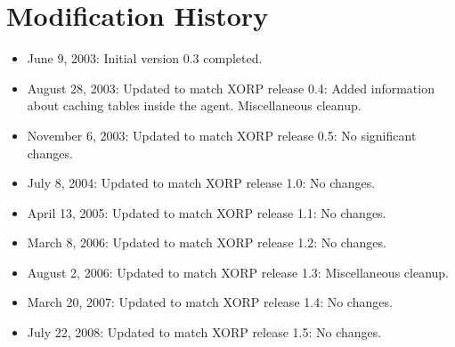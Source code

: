 \documentclass[11pt]{article}
\begin{document}
\appendix
\section{Modification History}

\begin{itemize}

  \item June 9, 2003: Initial version 0.3 completed.

  \item August 28, 2003: Updated to match XORP release 0.4:
   Added information about caching tables inside the agent. Miscellaneous
   cleanup.

  \item November 6, 2003: Updated to match XORP release 0.5:
   No significant changes.

  \item July 8, 2004: Updated to match XORP release 1.0:
   No changes.

  \item April 13, 2005: Updated to match XORP release 1.1:
   No changes.

  \item March 8, 2006: Updated to match XORP release 1.2:
   No changes.

  \item August 2, 2006: Updated to match XORP release 1.3:
   Miscellaneous cleanup.

  \item March 20, 2007: Updated to match XORP release 1.4:
   No changes.

  \item July 22, 2008: Updated to match XORP release 1.5:
   No changes.

\end{itemize}




\end{document}

